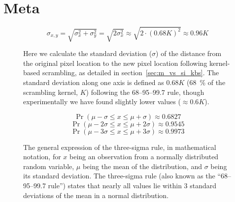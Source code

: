 \chapter{Meta}
    \begin{figure}[H]
	\[ \sigma_{x,y} = \sqrt{\sigma_{x}^{2}+\sigma_{y}^{2}} = \sqrt{2\sigma_{x}^{2}} \approx \sqrt{2 \cdot (0.68 K)^{2}} \approx 0.96K\]
	\caption{Here we calculate the standard deviation ($\sigma$) of the distance from the original pixel location to the new pixel location following kernel-based scrambling, as detailed in section~\ref{sec:m_vs_si_kbs}. The standard deviation along one axis is defined as $0.68K$ (\SI{68}{\percent} of the scrambling kernel, $K$) following the 68–95–99.7 rule, though experimentally we have found slightly lower values ($\approx 0.6K$).}\label{eq:lrgn}
    \end{figure}
    \begin{figure}[H]
	\[\Pr(\mu - \sigma \le x \le \mu + \sigma) \approx 0.6827 \]
	\[\Pr(\mu - 2\sigma \le x \le \mu + 2\sigma) \approx 0.9545 \]
	\[\Pr(\mu - 3\sigma \le x \le \mu + 3\sigma) \approx 0.9973 \]
	\caption{The general expression of the three-sigma rule, in mathematical notation, for $x$ being an observation from a normally distributed random variable, $\mu$ being the mean of the distribution, and $\sigma$ being its standard deviation. The three-sigma rule (also known as the “68–95–99.7 rule”) states that nearly all values lie within 3 standard deviations of the mean in a normal distribution.}\label{eq:3s}
    \end{figure}


